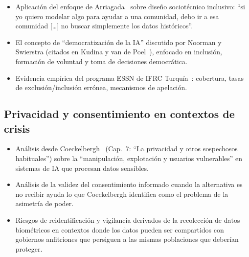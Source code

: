 \documentclass[12pt, a4paper]{article}
\begin{document}
\begin{itemize}[leftmargin=2em]
    \item Aplicación del enfoque de Arriagada~\cite{arriagada2024sesgos} sobre diseño sociotécnico inclusivo: ``si yo quiero modelar algo para ayudar a una comunidad, debo ir a esa comunidad [\ldots] no buscar simplemente los datos históricos''.
    \item El concepto de ``democratización de la IA'' discutido por Noorman y Swierstra (citados en Kudina y van de Poel~\cite{kudina2024sociotechnical}), enfocado en inclusión, formación de voluntad y toma de decisiones democrática.
    \item Evidencia empírica del programa ESSN de IFRC Turquía~\cite{efe2022review}: cobertura, tasas de exclusión/inclusión errónea, mecanismos de apelación.
\end{itemize}

\subsection{Privacidad y consentimiento en contextos de crisis}

\begin{itemize}[leftmargin=2em]
    \item Análisis desde Coeckelbergh~\cite{coeckelbergh2021etica} (Cap.~7: ``La privacidad y otros sospechosos habituales'') sobre la ``manipulación, explotación y usuarios vulnerables'' en sistemas de IA que procesan datos sensibles.
    \item Análisis de la validez del consentimiento informado cuando la alternativa es no recibir ayuda lo que Coeckelbergh identifica como el problema de la asimetría de poder.
    \item Riesgos de reidentificación y vigilancia derivados de la recolección de datos biométricos en contextos donde los datos pueden ser compartidos con gobiernos anfitriones que persiguen a las mismas poblaciones que deberían proteger.
\end{itemize}




\end{document}
